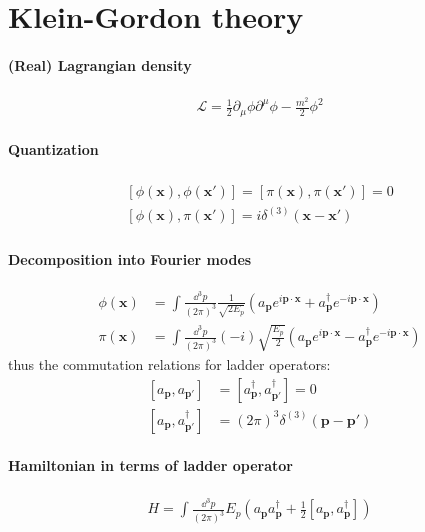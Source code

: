 \documentclass{scrartcl}
\newcommand{\lag}{\mathcal{L}}
\numberwithin{equation}{section}
\begin{document}
\section{Klein-Gordon theory}
\paragraph{(Real) Lagrangian density}
\begin{align}
	\lag = \frac{1}{2} \partial_\mu \phi \partial^\mu \phi - \frac{m^2}{2} \phi^2
\end{align}
\paragraph{Quantization}
\begin{align}
	\begin{split}
		\left[ \phi(\pmb{x}), \phi(\pmb{x}') \right] = \left[ \pi(\pmb{x}), \pi(\pmb{x}') \right] = 0 \\
		\left[ \phi(\pmb{x}), \pi(\pmb{x}') \right] = i \delta^{(3)}(\pmb{x} - \pmb{x}')
	\end{split}
\end{align}
\paragraph{Decomposition into Fourier modes}
\begin{align}
	\phi({\pmb{x}}) &= \int \frac{\dd^3 p}{(2\pi)^3}\frac{1}{\sqrt{2E_p}} \left( a_{\pmb{p}} e^{i\pmb{p}\cdot\pmb{x}} + a_{\pmb{p}}^\dagger e^{-i \pmb{p} \cdot \pmb{x}} \right) \\
	\pi({\pmb{x}}) &= \int \frac{\dd^3 p}{(2\pi)^3}(-i)\sqrt{\frac{E_p}{2}} \left( a_{\pmb{p}} e^{i\pmb{p}\cdot\pmb{x}} - a_{\pmb{p}}^\dagger e^{-i \pmb{p} \cdot \pmb{x}} \right)
\end{align}
thus the commutation relations for ladder operators:
\begin{align}
	\left[ a_{\pmb{p}}, a_{\pmb{p}'} \right] &= \left[ a^\dagger_{\pmb{p}}, a^\dagger_{\pmb{p}'} \right] = 0 \\
	\left[ a_{\pmb{p}}, a^\dagger_{\pmb{p}'} \right] &= (2\pi)^3 \delta^{(3)}(\pmb{p}-\pmb{p}')
\end{align}
\paragraph{Hamiltonian in terms of ladder operator}
\begin{align}
	H = \int \frac{\dd^3 p}{(2\pi)^3} E_p \left( a_{\pmb{p}} a_{\pmb{p}} ^\dagger + \frac{1}{2} \left[ a_{\pmb{p}}, a_{\pmb{p}}^\dagger \right] \right)
\end{align}
\end{document}

